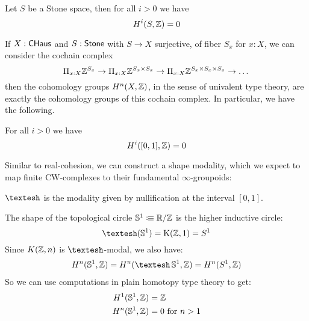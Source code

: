 \begin{theorem}
Let $S$ be a Stone space, then for all $i>0$ we have \[H^i(S,\mathbb{Z}) = 0\]
\end{theorem}

If $X:\mathsf{CHaus}$ and $S:\mathsf{Stone}$ with $S\rightarrow X$ surjective, of fiber $S_x$ for $x:X$,  we can consider the cochain complex
\[\Pi_{x:X}\mathbb{Z}^{S_x}\rightarrow \Pi_{x:X}\mathbb{Z}^{S_x\times S_x}\rightarrow \Pi_{x:X}\mathbb{Z}^{S_x\times S_x\times S_x}\rightarrow\dots\]
then the cohomology groups $H^n(X,\mathbb{Z})$, in the sense of univalent type theory, are exactly the cohomology groups of this
cochain complex. In particular, we have the following.

\begin{proposition}
For all $i>0$ we have \[H^i([0,1],\mathbb{Z}) = 0\]
\end{proposition}

Similar to real-cohesion, we can construct a shape modality, which we expect to map finite CW-complexes to their fundamental $\infty$-groupoids:

\begin{definition}
  $\shape$ is the modality given by nullification at the interval $[0,1]$.
\end{definition}

\begin{proposition}
  The shape of the topological circle $\mathbb{S}^1\vcentcolon\mspace{-1.2mu}\equiv \mathbb{R}/\mathbb{Z}$ is the higher inductive circle: 
  \[
  \shape(\bS^1)=\mathrm{K}(\Z,1)=S^1
  \]
  Since $K(\mathbb{Z},n)$ is $\shape$-modal, we also have:
  \begin{align*}
    H^n(\bS^1,\Z) = H^n(\shape \bS^1,\Z) = H^n(S^1,\Z) 
  \end{align*}
  So we can use computations in plain homotopy type theory to get:
  \begin{align*}
    H^1(\mathbb{S}^1,\mathbb{Z}) &= \mathbb{Z} \\
    H^n(\mathbb{S}^1,\mathbb{Z}) &= 0\text{ for $n>1$} 
  \end{align*}
\end{proposition}

